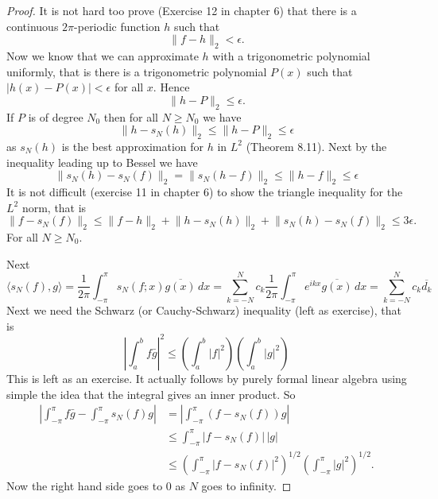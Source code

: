 \documentclass[12pt]{book}
\newcommand{\snorm}[1]{\lVert {#1} \rVert}
\newcommand{\abs}[1]{\left\lvert {#1} \right\rvert}
\theoremstyle{plain}
\theoremstyle{remark}
\theoremstyle{definition}
\theoremstyle{exercise}
\theoremstyle{example}
\begin{document}
\begin{proof}
It is not hard too prove (Exercise 12 in chapter 6) that there is
a continuous $2\pi$-periodic function $h$ such that
$$
\snorm{f-h}_2 < \epsilon .
$$
Now we know that we can approximate $h$ with a trigonometric polynomial
uniformly, that is there is a trigonometric polynomial $P(x)$
such that
$\abs{h(x) - P(x)} < \epsilon$ for all $x$.
Hence
$$
\snorm{h-P}_2 \leq \epsilon.
$$
If $P$ is of degree $N_0$ then for all $N \geq N_0$ we have
$$
\snorm{h-s_N(h)}_2 \leq \snorm{h-P}_2 \leq \epsilon
$$
as $s_N(h)$ is the best approximation for $h$ in $L^2$ (Theorem 8.11).
Next by the inequality leading up to Bessel we have
$$
\snorm{s_N(h)-s_N(f)}_2
=
\snorm{s_N(h-f)}_2
\leq
\snorm{h-f}_2 \leq \epsilon
$$
It is not difficult (exercise 11 in chapter 6) to show the triangle
inequality for the $L^2$ norm, that is
$$
\snorm{f-s_N(f)}_2
\leq
\snorm{f-h}_2
+
\snorm{h-s_N(h)}_2
+
\snorm{s_N(h)-s_N(f)}_2
\leq 3\epsilon .
$$
For all $N \geq N_0$.

Next
$$
\langle s_N(f) , g \rangle
=
\frac{1}{2\pi}
\int_{-\pi}^\pi
s_N(f;x) \overline{g(x)} \, dx
=
\sum_{k=-N}^N
c_k 
\frac{1}{2\pi}
\int_{-\pi}^\pi
e^{ikx}
\overline{g(x)} \, dx
=
\sum_{k=-N}^N
c_k 
\overline{d_k}
$$
Next we need the Schwarz (or Cauchy-Schwarz)
inequality (left as exercise), that is
$$
{\abs{\int_a^b f\bar{g}}}^2
\leq
\left( \int_a^b \abs{f}^2 \right)
\left( \int_a^b \abs{g}^2 \right)
$$
This is left as an exercise.  It actually follows by purely formal
linear algebra using simple the idea that the integral gives an inner
product.
So
\begin{equation*}
\begin{split}
\abs{\int_{-\pi}^\pi f\bar{g} - \int_{-\pi}^\pi s_N(f)g}
& =
\abs{\int_{-\pi}^\pi (f- s_N(f))g} \\
& \leq
\int_{-\pi}^\pi \abs{f- s_N(f)}\, \abs{g} \\
& \leq
{\left(\int_{-\pi}^\pi \abs{f- s_N(f)}^2 \right)}^{1/2}
{\left( \int_{-\pi}^\pi \abs{g}^2 \right)}^{1/2} .
\end{split}
\end{equation*}
$$
$$
Now the right hand side goes to 0 as $N$ goes to infinity.
\end{proof}


\end{document}
